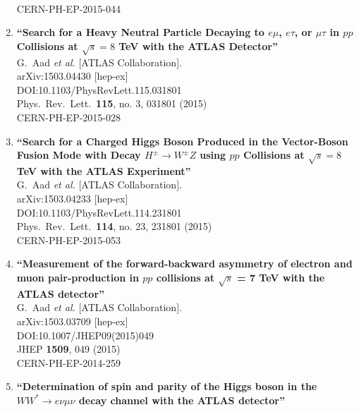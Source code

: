 \documentclass{article}
\begin{document}
\begin{enumerate}
  \\{}CERN-PH-EP-2015-044
\item%
{\bf ``Search for a Heavy Neutral Particle Decaying to $e\mu$, $e\tau$, or $\mu\tau$ in $pp$ Collisions at $\sqrt{s}=8$ TeV with the ATLAS Detector''}
  \\{}G.~Aad {\it et al.} [ATLAS Collaboration].
  \\{}arXiv:1503.04430 [hep-ex]
  \\{}DOI:10.1103/PhysRevLett.115.031801
  \\{}Phys.\ Rev.\ Lett.\  {\bf 115}, no. 3, 031801 (2015)
  \\{}CERN-PH-EP-2015-028
\item%
{\bf ``Search for a Charged Higgs Boson Produced in the Vector-Boson Fusion Mode with Decay $H^\pm \to W^\pm Z$ using $pp$ Collisions at $\sqrt{s}=8$  TeV with the ATLAS Experiment''}
  \\{}G.~Aad {\it et al.} [ATLAS Collaboration].
  \\{}arXiv:1503.04233 [hep-ex]
  \\{}DOI:10.1103/PhysRevLett.114.231801
  \\{}Phys.\ Rev.\ Lett.\  {\bf 114}, no. 23, 231801 (2015)
  \\{}CERN-PH-EP-2015-053
\item%
{\bf ``Measurement of the forward-backward asymmetry of electron and muon pair-production in $pp$ collisions at $\sqrt{s}$ = 7 TeV with the ATLAS detector''}
  \\{}G.~Aad {\it et al.} [ATLAS Collaboration].
  \\{}arXiv:1503.03709 [hep-ex]
  \\{}DOI:10.1007/JHEP09(2015)049
  \\{}JHEP {\bf 1509}, 049 (2015)
  \\{}CERN-PH-EP-2014-259
\item%
{\bf ``Determination of spin and parity of the Higgs boson in the $WW^*\rightarrow e \nu \mu \nu $ decay channel with the ATLAS detector''}

\end{enumerate}
\end{document}
